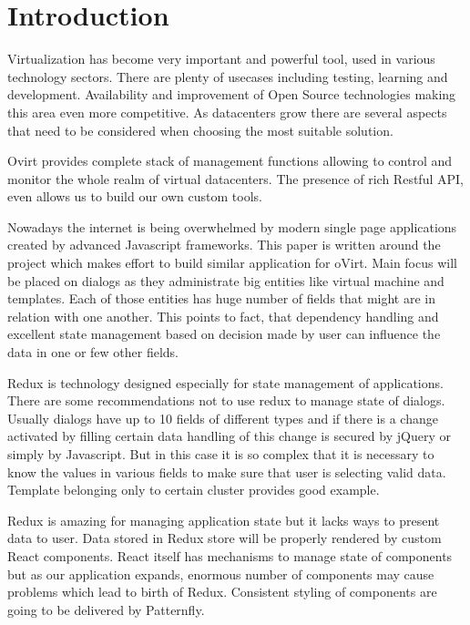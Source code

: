 
\chapter{Introduction}
Virtualization has become very important and powerful tool, used in various technology sectors. There are plenty of usecases including testing, learning and development. Availability and improvement of Open Source technologies making this area even more competitive. As datacenters grow there are several aspects that need to be considered when choosing the most suitable solution.

Ovirt provides complete stack of management functions allowing to control and monitor the whole realm of virtual datacenters. The presence of rich Restful API, even allows us to build our own custom tools. 

Nowadays the internet is being overwhelmed by modern single page applications created by advanced Javascript frameworks. This paper is written around the project which makes effort to build similar application for oVirt. Main focus will be placed on dialogs as they administrate big entities like virtual machine and templates. Each of those entities has huge number of fields that might are in relation with one another. This points to fact, that dependency handling and excellent state management based on decision made by user can influence the data in one or few other fields. 

Redux is technology designed especially for state management of applications. There are some recommendations not to use redux to manage state of dialogs. Usually dialogs have up to 10 fields of different types and if there is a change activated by filling certain data handling of this change is secured by jQuery or simply by Javascript. But in this case it is so complex that it is necessary to know the values in various fields to make sure that user is selecting valid data. Template belonging only to certain cluster provides good example.

Redux is amazing for managing application state but it lacks ways to present data to user. Data stored in Redux store will be properly rendered by custom React components. React itself has mechanisms to manage state of components but as our application expands, enormous number of components may cause problems which lead to birth of Redux. Consistent styling of components are going to be delivered by Patternfly. 

